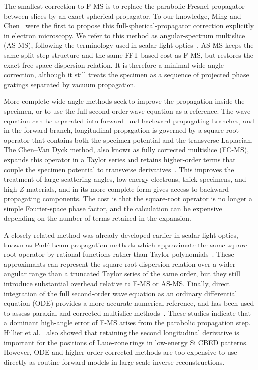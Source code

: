 \documentclass[preprint,12pt,number]{elsarticle}
\begin{document}
The smallest correction to F-MS is to replace the parabolic Fresnel propagator
between slices by an exact spherical propagator. To our
knowledge, Ming and Chen~\cite{ming2013pcms} were the first to propose this
full-spherical-propagator correction explicitly in electron microscopy. We refer to
this method as angular-spectrum multislice (AS-MS), following the terminology
used in scalar light optics~\cite{goodman}. AS-MS keeps the same split-step structure
and the same FFT-based cost as F-MS, but restores the exact free-space
dispersion relation. It is therefore a minimal wide-angle correction, although
it still treats the specimen as a sequence of projected phase gratings
separated by vacuum propagation.

More complete wide-angle methods seek to improve the propagation inside the specimen, or to use the full second-order wave equation as a reference. The wave equation can be separated into forward- and backward-propagating branches, and in the forward branch, longitudinal propagation is governed by a square-root operator that contains both the specimen potential and the transverse Laplacian. The Chen--Van Dyck method, also known as fully corrected multislice (FC-MS), expands this operator in a Taylor series and retains higher-order terms that couple the specimen potential to transverse derivatives~\cite{ChenVanDyck1997,ming2013pcms}. This improves the treatment of
large scattering angles, low-energy electrons, thick specimens, and high-$Z$
materials, and in its more complete form gives access to backward-propagating
components. The cost is that the square-root operator is no longer a simple
Fourier-space phase factor, and the calculation can be expensive depending on
the number of terms retained in the expansion.

A closely related method was already developed earlier in scalar light optics, known as Pad\'e
beam-propagation methods which approximate the same square-root operator by rational
functions rather than Taylor polynomials~\cite{Hadley1992}. These
approximants can represent the square-root dispersion relation over a wider
angular range than a truncated Taylor series of the same order, but they still
introduce substantial overhead relative to F-MS or AS-MS. 
Finally, direct integration of
the full second-order wave equation as an ordinary differential equation (ODE)
provides a more accurate numerical reference, and has been used to assess
paraxial and corrected multislice
methods~\cite{RotherScheerschmidt2009,WackerSchroeder2015}. These studies indicate
that a dominant high-angle error of F-MS arises from the parabolic propagation
step. Hillier et al.~\cite{hillier_role_2017} also showed that retaining the
second longitudinal derivative is important for the positions of Laue-zone
rings in low-energy Si CBED patterns. However, ODE and higher-order corrected
methods are too expensive to use directly as routine forward models in
large-scale inverse reconstructions.
\end{document}
